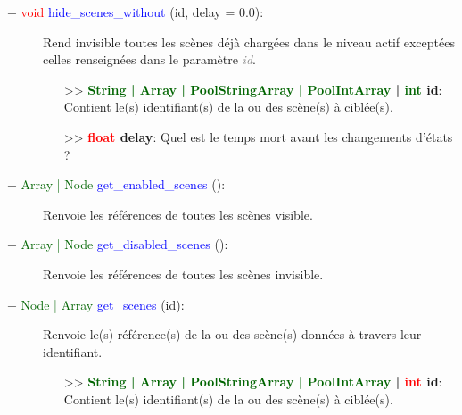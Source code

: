 \documentclass[a4paper, 11pt]{article}
\begin{document}
	\begin{description}
		\item [+ \textcolor{red}{void} \textcolor{blue}{hide\_scenes\_without} (id, delay = 0.0):] Rend 
		invisible toutes les scènes déjà chargées dans le niveau actif exceptées celles renseignées dans le 
		paramètre \textcolor{gray}{\textit{id}}.
		\begin{itemize}
			\item [>> \textbf{\textcolor{darkgreen}{String | Array | PoolStringArray | PoolIntArray} | 
			\textcolor{darkgreen}{int} id}:] Contient le(s) identifiant(s) de la ou des scène(s) à 
			ciblée(s).
			\item [>> \textbf{\textcolor{red}{float} delay}:] Quel est le temps mort avant les changements
			d'états ?\\
		\end{itemize}
	\end{description}
	\begin{description}
		\item [+ \textcolor{darkgreen}{Array | Node} \textcolor{blue}{get\_enabled\_scenes} ():] Renvoie les
		références de toutes les scènes visible.\\
	\end{description}
	\begin{description}
		\item [+ \textcolor{darkgreen}{Array | Node} \textcolor{blue}{get\_disabled\_scenes} ():] Renvoie 
		les références de toutes les scènes invisible.\\
	\end{description}
	\begin{description}
		\item [+ \textcolor{darkgreen}{Node | Array} \textcolor{blue}{get\_scenes} (id):] Renvoie le(s)
		référence(s) de la ou des scène(s) données à travers leur identifiant.
		\begin{itemize}
			\item [>> \textbf{\textcolor{darkgreen}{String | Array | PoolStringArray | PoolIntArray} |
			\textcolor{red}{int} id}:] Contient le(s) identifiant(s) de la ou des scène(s) à ciblée(s).\\
		\end{itemize}
	\end{description}
\end{document}
